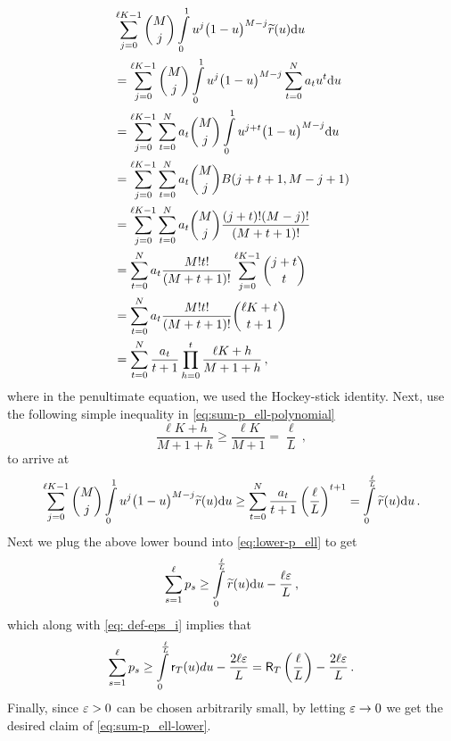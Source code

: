 \documentclass[11pt]{article}
\begin{document}
 \begin{align}
 	&\sum\limits_{j=0}^{\ell K-1} \binom{M}{j}\int\limits_{0}^{1}u^{j}\big(1-u\big)^{M-j}\widetilde{r}(u){\rm d} u\nonumber\\
 	&=\sum\limits_{j=0}^{\ell K-1} \binom{M}{j}\int\limits_{0}^{1}u^{j}\big(1-u\big)^{M-j}\sum\limits_{t=0}^{N}a_tu^t{\rm d} u\nonumber\\
 	&=\sum\limits_{j=0}^{ \ell K-1}
 	\sum\limits_{t=0}^{N}a_t \binom{M}{j}\int\limits_{0}^{1}u^{j+t}\big(1-u\big)^{M-j}{\rm d} u\nonumber\\
 	&=\sum\limits_{j=0}^{\ell K-1}
 	\sum\limits_{t=0}^{N}a_t \binom{M}{j}B(j+t+1,M-j+1)\nonumber\\
 	&=\sum\limits_{j=0}^{\ell K-1}
 	\sum\limits_{t=0}^{N}a_t \binom{M}{j} \frac{(j+t)!(M-j)!}{(M+t+1)!\nonumber}\\
 	&=	\sum\limits_{t=0}^{N} a_t\frac{M!t!}{(M+t+1)!}\sum\limits_{j=0}^{\ell K-1}
 \binom{j+t}{t}\nonumber\\
 &=	\sum\limits_{t=0}^{N} a_t\frac{M!t!}{(M+t+1)!}
 \binom{\ell K+t}{t+1}\nonumber\\
 &=	\sum\limits_{t=0}^{N} \frac{a_t}{t+1}\prod\limits_{h=0}^{t}\frac{\ell K +h}{M+1+h}\label{eq:sum-p_ell-polynomial}\,,
 \end{align}
where in the penultimate equation, we used the Hockey-stick identity. Next, use the following simple inequality in \eqref{eq:sum-p_ell-polynomial}
 $$\frac{\ell K+h}{M+1+h}\geq \frac{\ell K}{M+1}=\frac{\ell}{L}\,,$$
to arrive at
\begin{align*}
\sum\limits_{j=0}^{\ell K-1} \binom{M}{j}\int\limits_{0}^{1}u^{j}\big(1-u\big)^{M-j}\widetilde{r}(u){\rm d} u\nonumber\geq \sum\limits_{t=0}^{N} \frac{a_t}{t+1}\left( \frac{\ell}{L} \right)^{t+1}=\int\limits_{0}^{\frac{\ell}{L}} \widetilde{r}(u){\rm d} u\,.
\end{align*}
Next we plug the above lower bound into \eqref{eq:lower-p_ell} to get
\[
\sum\limits_{s=1}^{\ell}p_{s} \geq \int\limits_{0}^{\frac{\ell}{L}} \widetilde{r}(u){\rm d} u-\frac{\ell{\varepsilon}}{L}\,,
\]
which along with \eqref{eq: def-eps_i} implies that
%
\[
\sum\limits_{s=1}^{\ell}p_{s} \geq \int\limits_{0}^{\frac{\ell}{L}} \mathsf{r}_T(u)du-\frac{2\ell{\varepsilon}}{L}=\mathsf{R}_{T}\left(\frac{\ell}{L} \right)-\frac{2\ell{\varepsilon}}{L}\,.
\]
Finally, since ${\varepsilon}>0$ can be chosen arbitrarily small, by letting ${\varepsilon}\to 0$ we get the desired claim of \eqref{eq:sum-p_ell-lower}.
\end{document}
